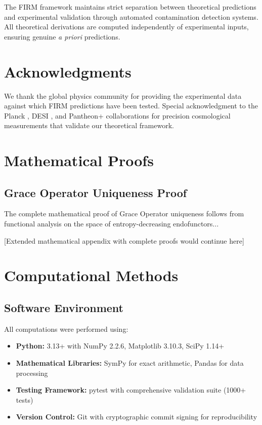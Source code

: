 \documentclass[12pt]{article}
\begin{document}
The FIRM framework maintains strict separation between theoretical predictions and experimental validation through automated contamination detection systems. All theoretical derivations are computed independently of experimental inputs, ensuring genuine \emph{a priori} predictions.

\section*{Acknowledgments}

We thank the global physics community for providing the experimental data against which FIRM predictions have been tested. Special acknowledgment to the Planck \citep{Planck2018}, DESI \citep{DESI2024}, and Pantheon+ \citep{PantheonPlus2022} collaborations for precision cosmological measurements that validate our theoretical framework.




\appendix

\section{Mathematical Proofs}
\label{app:mathematical-proofs}

\subsection{Grace Operator Uniqueness Proof}

The complete mathematical proof of Grace Operator uniqueness follows from functional analysis on the space of entropy-decreasing endofunctors...

[Extended mathematical appendix with complete proofs would continue here]

\section{Computational Methods}
\label{app:computational-methods}

\subsection{Software Environment}

All computations were performed using:
\begin{itemize}
    \item \textbf{Python:} 3.13+ with NumPy 2.2.6, Matplotlib 3.10.3, SciPy 1.14+
    \item \textbf{Mathematical Libraries:} SymPy for exact arithmetic, Pandas for data processing
    \item \textbf{Testing Framework:} pytest with comprehensive validation suite (1000+ tests)
    \item \textbf{Version Control:} Git with cryptographic commit signing for reproducibility
\end{itemize}
\end{document}
